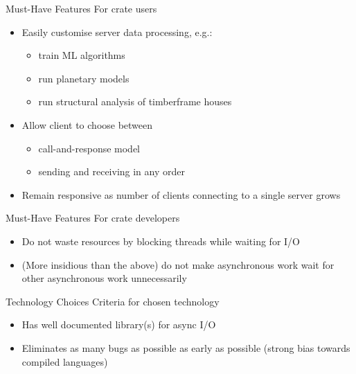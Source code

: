 \documentclass{beamer}
\begin{document}
\begin{frame}{Must-Have Features}
  For crate users
  \begin{itemize}[<+->]
    \item<1> Easily customise server data processing, e.g.:
    \begin{itemize}[<+->]
      \item<1> train ML algorithms
      \item<1> run planetary models
      \item<1> run structural analysis of timberframe houses
    \end{itemize}
    \item<2> Allow client to choose between
      \begin{itemize}[<+->]
        \item<2> call-and-response model 
        \item<2> sending and receiving in any order
      \end{itemize}
    \item<3> Remain responsive as number of clients connecting to a single server grows
  \end{itemize}
\end{frame}

\begin{frame}{Must-Have Features}
  For crate developers
  \begin{itemize}[<+->]
    \item<1> Do not waste resources by blocking threads while waiting for I/O
    \item<2> (More insidious than the above) do not make asynchronous work wait for other asynchronous work
      unnecessarily
  \end{itemize}
\end{frame}

\begin{frame}{Technology Choices}
  Criteria for chosen technology
  \begin{itemize}[<+->]
    \item<1> Has well documented library(s) for async I/O
    \item<2> Eliminates as many bugs as possible as early as possible (strong bias towards compiled languages)
  \end{itemize}
\end{frame}
\end{document}
